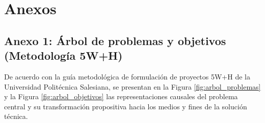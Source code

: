\newpage
\section{Anexos}

\subsection{Anexo 1: Árbol de problemas y objetivos (Metodología 5W+H)}

De acuerdo con la guía metodológica de formulación de proyectos 5W+H de la Universidad Politécnica Salesiana, se presentan en la Figura \ref{fig:arbol_problemas} y la Figura \ref{fig:arbol_objetivos} las representaciones causales del problema central y su transformación propositiva hacia los medios y fines de la solución técnica.

